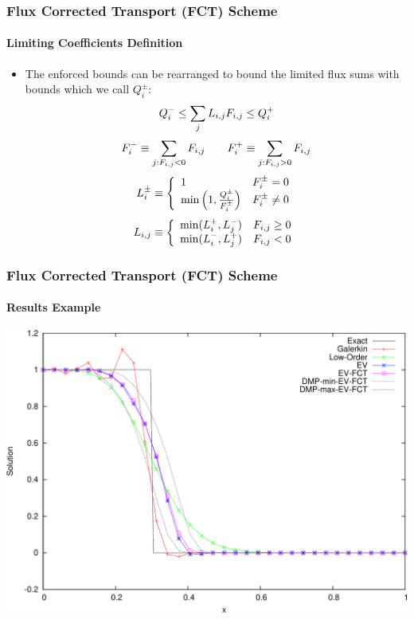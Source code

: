 \documentclass{beamer}
\begin{document}
\begin{frame}
\frametitle{Flux Corrected Transport (FCT) Scheme}
\framesubtitle{Limiting Coefficients Definition}

\begin{itemize}
   \item The enforced bounds can be rearranged to bound the limited flux sums
      with bounds which we call $Q_i^\pm$:
      \begin{equation}
         Q^-_i \leq \sum\limits_j L_{i,j} F_{i,j} \leq Q^+_i
      \end{equation}
      \begin{equation}
         F_i^- \equiv \sum\limits_{j:F_{i,j}<0} F_{i,j} \qquad
         F_i^+ \equiv \sum\limits_{j:F_{i,j}>0} F_{i,j}
      \end{equation}
      \begin{equation}
         L_i^\pm \equiv\left\{
            \begin{array}{l l}
               1                                          & F_i^\pm = 0\\
               \min\left(1,\frac{Q_i^\pm}{F_i^\pm}\right) & F_i^\pm \ne 0
            \end{array}
            \right.
      \end{equation}
      \begin{equation}
         L_{i,j} \equiv\left\{
            \begin{array}{l l}
               \min(L_i^+,L_j^-) & F_{i,j} \geq 0\\
               \min(L_i^-,L_j^+) & F_{i,j} < 0
            \end{array}
            \right.
      \end{equation}
\end{itemize}

\end{frame}
\begin{frame}
\frametitle{Flux Corrected Transport (FCT) Scheme}
\framesubtitle{Results Example}

\includegraphics[width=\textwidth]{./figures/advection_FCT.pdf}

\end{frame}
\end{document}
